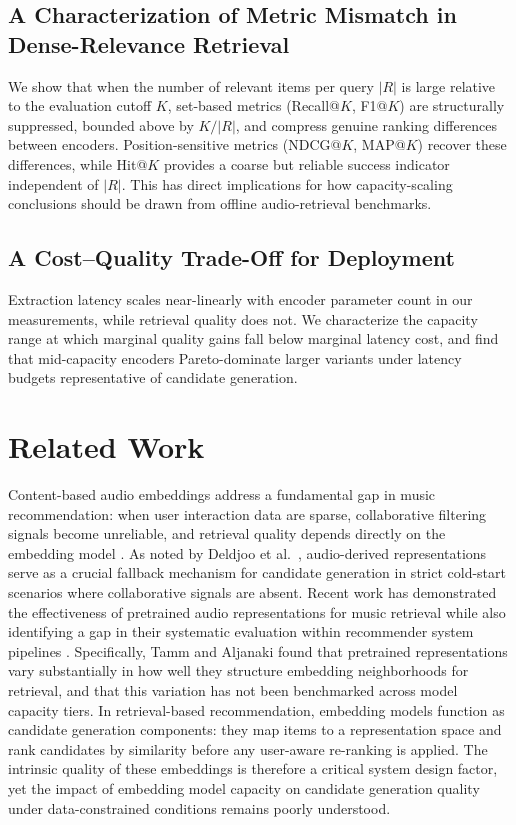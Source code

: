 \documentclass{CPP}
\begin{document}
\section{A Characterization of Metric Mismatch in Dense-Relevance Retrieval}
We show that when the number of relevant items per query $|R|$ is large relative to the evaluation cutoff $K$, set-based metrics (Recall@$K$, F1@$K$) are structurally suppressed, bounded above by $K/|R|$, and compress genuine ranking differences between encoders. Position-sensitive metrics (NDCG@$K$, MAP@$K$) recover these differences, while Hit@$K$ provides a coarse but reliable success indicator independent of $|R|$. This has direct implications for how capacity-scaling conclusions should be drawn from offline audio-retrieval benchmarks.

\section{A Cost--Quality Trade-Off for Deployment}
Extraction latency scales near-linearly with encoder parameter count in our measurements, while retrieval quality does not. We characterize the capacity range at which marginal quality gains fall below marginal latency cost, and find that mid-capacity encoders Pareto-dominate larger variants under latency budgets representative of candidate generation.

\chapter{Related Work}\label{sec:related-work}

Content-based audio embeddings address a fundamental gap in music recommendation: when user interaction data are sparse, collaborative filtering signals become unreliable, and retrieval quality depends directly on the embedding model \cite{schedl2018}. As noted by Deldjoo et al.\ \cite{deldjoo2024}, audio-derived representations serve as a crucial fallback mechanism for candidate generation in strict cold-start scenarios where collaborative signals are absent. Recent work has demonstrated the effectiveness of pretrained audio representations for music retrieval while also identifying a gap in their systematic evaluation within recommender system pipelines \cite{tamm2024}. Specifically, Tamm and Aljanaki \cite{tamm2024} found that pretrained representations vary substantially in how well they structure embedding neighborhoods for retrieval, and that this variation has not been benchmarked across model capacity tiers. In retrieval-based recommendation, embedding models function as candidate generation components: they map items to a representation space and rank candidates by similarity before any user-aware re-ranking is applied. The intrinsic quality of these embeddings is therefore a critical system design factor, yet the impact of embedding model capacity on candidate generation quality under data-constrained conditions remains poorly understood.
\end{document}

